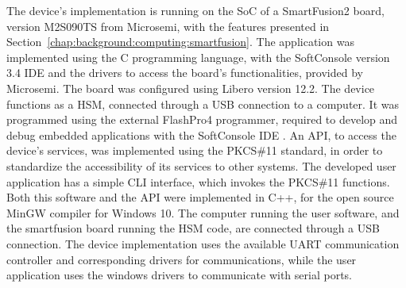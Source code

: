The device's implementation is running on the SoC of a SmartFusion2 board, version M2S090TS from Microsemi, with the features presented in Section~\ref{chap:background:computing:smartfusion}.
The application was implemented using the C programming language, with the SoftConsole version 3.4 IDE and the drivers to access the board's functionalities, provided by Microsemi. The board was configured using Libero version 12.2.
The device functions as a HSM, connected through a USB connection to a computer. It was programmed using the external FlashPro4 programmer, required to develop and debug embedded applications with the SoftConsole IDE \cite{smartfusionSecurityPractices}.
An API, to access the device's services, was implemented using the PKCS\#11 standard, in order to standardize the accessibility of its services to other systems. The developed user application has a simple \ac{CLI} interface, which invokes the PKCS\#11 functions. Both this software and the API were implemented in C++, for the open source MinGW compiler for Windows 10.
The computer running the user software, and the smartfusion board running the HSM code, are connected through a USB connection.
The device implementation uses the available \ac{UART} communication controller and corresponding drivers for communications, while the user application uses the windows drivers to communicate with serial ports.

